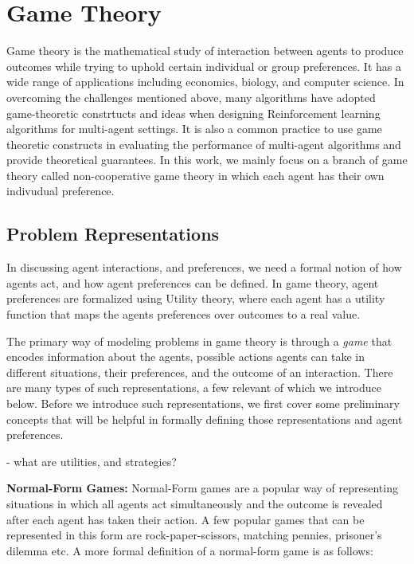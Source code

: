 \section{Game Theory}

Game theory is the mathematical study of interaction between agents to produce outcomes while
trying to uphold certain individual or group preferences.
It has a wide range of applications including economics, biology, and computer science.
In overcoming the challenges mentioned above, many algorithms have adopted game-theoretic
constrtucts and ideas when designing Reinforcement learning algorithms for multi-agent settings.
It is also a common practice to use game theoretic constructs in evaluating the performance of
multi-agent algorithms and provide theoretical guarantees.
In this work, we mainly focus on a branch of game theory called non-cooperative game theory in
which each agent has their own indivudual preference.

\subsection{Problem Representations}
\label{subsec:reps}

In discussing agent interactions, and preferences, we need a formal notion of how agents act, and
how agent preferences can be defined.
In game theory, agent preferences are formalized using Utility theory, where each agent has a
utility function that maps the agents preferences over outcomes to a real value.

The primary way of modeling problems in game theory is through a \textit{game} that encodes
information about the agents, possible actions agents can take in different situations, their
preferences, and the outcome of an interaction.
There are many types of such representations, a few relevant of which we introduce below.
Before we introduce such representations, we first cover some preliminary concepts that will be
helpful in formally defining those representations and agent preferences.

- what are utilities, and strategies?

\textbf{Normal-Form Games:} Normal-Form games are a popular way of representing situations in which all agents act
simultaneously and the outcome is revealed after each agent has taken their action.
A few popular games that can be represented in this form are rock-paper-scissors, matching pennies,
prisoner's dilemma etc. A more formal definition of a normal-form game is as follows:

